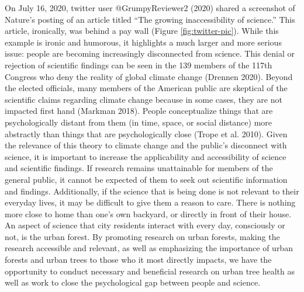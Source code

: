 \documentclass[12pt,twoside]{reedthesis}
\begin{document}
On July 16, 2020, twitter user @GrumpyReviewer2 (2020) shared a
screenshot of Nature's posting of an article titled ``The growing
inaccessibility of science.'' This article, ironically, was behind a pay
wall (Figure \ref{fig:twitter-pic}). While this example is ironic and
humorous, it highlights a much larger and more serious issue: people are
becoming increasingly disconnected from science. This denial or
rejection of scientific findings can be seen in the 139 members of the
117th Congress who deny the reality of global climate change (Drennen 2020).
Beyond the elected officials, many members of the American public are
skeptical of the scientific claims regarding climate change because in
some cases, they are not impacted first hand (Markman 2018). People
conceptualize things that are psychologically distant from them (in
time, space, or social distance) more abstractly than things that are
psychologically close (Trope et al. 2010). Given the relevance of this theory
to climate change and the public's disconnect with science, it is
important to increase the applicability and accessibility of science and
scientific findings. If research remains unattainable for members of the
general public, it cannot be expected of them to seek out scientific
information and findings. Additionally, if the science that is being
done is not relevant to their everyday lives, it may be difficult to
give them a reason to care. There is nothing more close to home than
one's own backyard, or directly in front of their house. An aspect of
science that city residents interact with every day, consciously or not,
is the urban forest. By promoting research on urban forests, making the
research accessible and relevant, as well as emphasizing the importance
of urban forests and urban trees to those who it most directly impacts,
we have the opportunity to conduct necessary and beneficial research on
urban tree health as well as work to close the psychological gap between
people and science.
\end{document}
